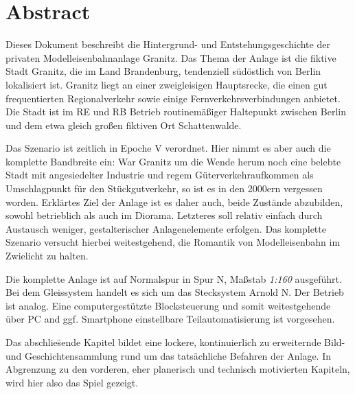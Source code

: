 \section{Abstract}
\label{sec:abstract}

Dieses Dokument beschreibt die Hintergrund- und Entstehungsgeschichte der privaten Modelleisenbahnanlage Granitz.
Das Thema der Anlage ist die fiktive Stadt Granitz, die im Land Brandenburg, tendenziell s\"ud\"ostlich von Berlin lokalisiert ist.
Granitz liegt an einer zweigleisigen Hauptsrecke, die einen gut frequentierten Regionalverkehr sowie einige Fernverkehrsverbindungen anbietet.
Die Stadt ist im RE und RB Betrieb routinem\"a{\ss}iger Haltepunkt zwischen Berlin und dem etwa gleich gro{\ss}en fiktiven Ort Schattenwalde.

Das Szenario ist zeitlich in Epoche V verordnet.
Hier nimmt es aber auch die komplette Bandbreite ein:
War Granitz um die Wende herum noch eine belebte Stadt mit angesiedelter Industrie und regem G\"uterverkehraufkommen als Umschlagpunkt f\"ur den St\"uckgutverkehr, so ist es in den 2000ern vergessen worden.
Erkl\"artes Ziel der Anlage ist es daher auch, beide Zust\"ande abzubilden, sowohl betrieblich als auch im Diorama.
Letzteres soll relativ einfach durch Austausch weniger, gestalterischer Anlagenelemente erfolgen.
Das komplette Szenario versucht hierbei weitestgehend, die Romantik von Modelleisenbahn im Zwielicht zu halten.

Die komplette Anlage ist auf Normalspur in Spur N, Ma{\ss}stab \textit{1:160} ausgef\"uhrt.
Bei dem Gleissystem handelt es sich um das Stecksystem Arnold N.
Der Betrieb ist analog.
Eine computergest\"utzte Blocksteuerung und somit weitestgehende \"uber PC and ggf. Smartphone einstellbare Teilautomatisierung ist vorgesehen.

Das abschlie\"sende Kapitel bildet eine lockere, kontinuierlich zu erweiternde Bild- und Geschichtensammlung rund um das tats\"achliche Befahren der Anlage.
In Abgrenzung zu den vorderen, eher planerisch und technisch motivierten Kapiteln, wird hier also das Spiel gezeigt.